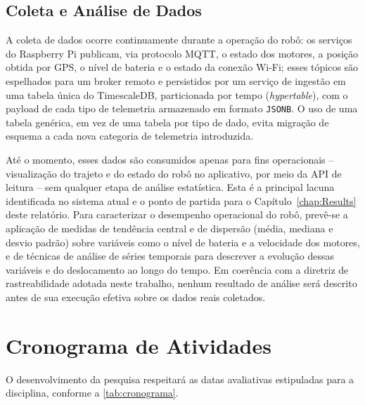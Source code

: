 \subsection{Coleta e Análise de Dados} \label{subsec:data_collection}
A coleta de dados ocorre continuamente durante a operação do robô: os serviços do Raspberry Pi publicam, via protocolo MQTT, o estado dos motores, a posição obtida por GPS, o nível de bateria e o estado da conexão Wi-Fi; esses tópicos são espelhados para um broker remoto e persistidos por um serviço de ingestão em uma tabela única do TimescaleDB, particionada por tempo (\textit{hypertable}), com o payload de cada tipo de telemetria armazenado em formato \texttt{JSONB}. O uso de uma tabela genérica, em vez de uma tabela por tipo de dado, evita migração de esquema a cada nova categoria de telemetria introduzida.

Até o momento, esses dados são consumidos apenas para fins operacionais -- visualização do trajeto e do estado do robô no aplicativo, por meio da API de leitura -- sem qualquer etapa de análise estatística. Esta é a principal lacuna identificada no sistema atual e o ponto de partida para o Capítulo~\ref{chap:Results} deste relatório. Para caracterizar o desempenho operacional do robô, prevê-se a aplicação de medidas de tendência central e de dispersão (média, mediana e desvio padrão) sobre variáveis como o nível de bateria e a velocidade dos motores, e de técnicas de análise de séries temporais para descrever a evolução dessas variáveis e do deslocamento ao longo do tempo. Em coerência com a diretriz de rastreabilidade adotada neste trabalho, nenhum resultado de análise será descrito antes de sua execução efetiva sobre os dados reais coletados.

\section{Cronograma de Atividades} \label{sec:schedule_activities_table}
O desenvolvimento da pesquisa respeitará as datas avaliativas estipuladas para a disciplina, conforme a \autoref{tab:cronograma}.


